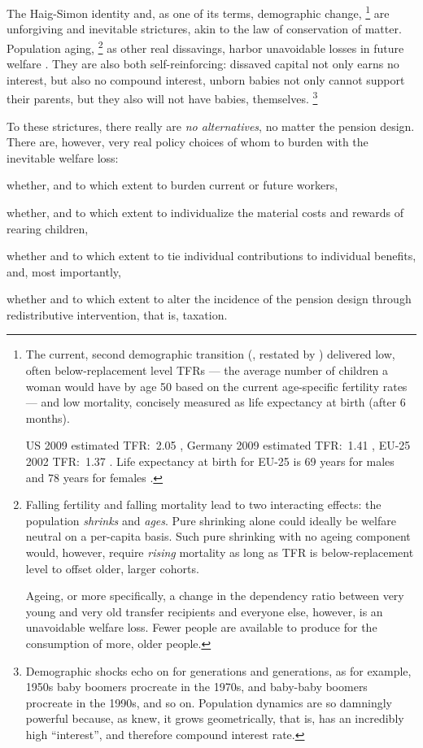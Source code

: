 The Haig-Simon identity and, as one of its terms, demographic change,
\footnote{
	The current, second demographic transition (\citealt{Davis1945}, restated by \citealt{Caldwell-1976-aa}) delivered low, often below-replacement level \glspl{TFR} --- the average number of children a woman would have by age 50 based on the current age-specific fertility rates --- and low mortality, concisely measured as life expectancy at birth (after 6 months).

	US 2009 estimated TFR:\ 2.05 \citep{CIA2009}, Germany 2009 estimated TFR:\ 1.41 \citep{CIA2009}, EU-25 2002 TFR:\ 1.37 \citep[2]{Demeny-2003-aa}.
	Life expectancy at birth for EU-25 is 69 years for males and 78 years for females \citep[2]{Demeny-2003-aa}.
}
are unforgiving and inevitable strictures, akin to the law of conservation of matter.
Population aging,
\footnote{
	Falling fertility and falling mortality lead to two interacting effects:
	the population \emph{shrinks} and \emph{ages}.
	Pure shrinking alone could ideally be welfare neutral on a per-capita basis.
	Such pure shrinking with no ageing component would, however, require \emph{rising} mortality as long as TFR is below-replacement level to offset older, larger cohorts.

	Ageing, or more specifically, a change in the dependency ratio between very young and very old transfer recipients and everyone else, however, is an unavoidable welfare loss.
	Fewer people are available to produce for the consumption of more, older people.
}
as other real dissavings, harbor unavoidable losses in future welfare \citep[for example][152]{Borsch-Supan2003}.
They are also both self-reinforcing:
dissaved capital not only earns no interest, but also no compound interest, unborn babies not only cannot support their parents, but they also will not have babies, themselves.
\footnote{
	Demographic shocks echo on for generations and generations, as for example, 1950s baby boomers procreate in the 1970s, and baby-baby boomers procreate in the 1990s, and so on.
	Population dynamics are so damningly powerful because, as \cite{Malthus1798} knew, it grows geometrically, that is, has an incredibly high ``interest'', and therefore compound interest rate.
}

To these strictures, there really are \emph{no alternatives}, no matter the pension design.
There are, however, very real policy choices of whom to burden with the inevitable welfare loss:
\begin{inparaenum} \item whether, and to which extent to burden current or future workers, \item whether, and to which extent to individualize the material costs and rewards of rearing children, \item whether and to which extent to tie individual contributions to individual benefits, and, most importantly, \item whether and to which extent to alter the incidence of the pension design through redistributive intervention, that is, taxation.
\end{inparaenum}

